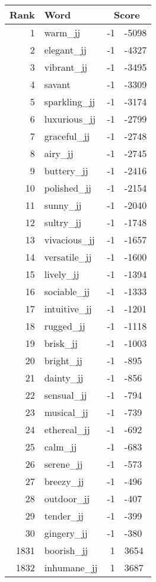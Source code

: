 \begin{longtable}[!htbp]{| rlr@{.}l |}
    \hline
    \textbf{Rank} & \textbf{Word} & \multicolumn{2}{c|}{\textbf{Score}} \\
    \hline
    \endhead
    1 & warm\_jj & -1 & -5098 \\
    2 & elegant\_jj & -1 & -4327 \\
    3 & vibrant\_jj & -1 & -3495 \\
    4 & savant & -1 & -3309 \\
    5 & sparkling\_jj & -1 & -3174 \\
    6 & luxurious\_jj & -1 & -2799 \\
    7 & graceful\_jj & -1 & -2748 \\
    8 & airy\_jj & -1 & -2745 \\
    9 & buttery\_jj & -1 & -2416 \\
    10 & polished\_jj & -1 & -2154 \\
    11 & sunny\_jj & -1 & -2040 \\
    12 & sultry\_jj & -1 & -1748 \\
    13 & vivacious\_jj & -1 & -1657 \\
    14 & versatile\_jj & -1 & -1600 \\
    15 & lively\_jj & -1 & -1394 \\
    16 & sociable\_jj & -1 & -1333 \\
    17 & intuitive\_jj & -1 & -1201 \\
    18 & rugged\_jj & -1 & -1118 \\
    19 & brisk\_jj & -1 & -1003 \\
    20 & bright\_jj & -1 & -895 \\
    21 & dainty\_jj & -1 & -856 \\
    22 & sensual\_jj & -1 & -794 \\
    23 & musical\_jj & -1 & -739 \\
    24 & ethereal\_jj & -1 & -692 \\
    25 & calm\_jj & -1 & -683 \\
    26 & serene\_jj & -1 & -573 \\
    27 & breezy\_jj & -1 & -496 \\
    28 & outdoor\_jj & -1 & -407 \\
    29 & tender\_jj & -1 & -399 \\
    30 & gingery\_jj & -1 & -380 \\
    1831 & boorish\_jj & 1 & 3654 \\
    1832 & inhumane\_jj & 1 & 3687 \\

\end{longtable}
